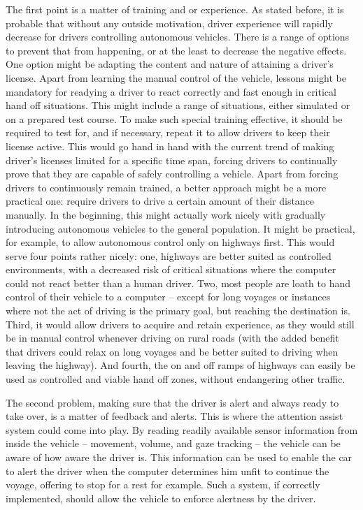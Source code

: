 \documentclass{acm_proc_article-sp}
\begin{document}
The first point is a matter of training and or experience.
As stated before, it is probable that without any outside motivation, driver experience will rapidly decrease for drivers controlling autonomous vehicles.
There is a range of options to prevent that from happening, or at the least to decrease the negative effects.
One option might be adapting the content and nature of attaining a driver's license.
Apart from learning the manual control of the vehicle, lessons might be mandatory for readying a driver to react correctly and fast enough in critical hand off situations.
This might include a range of situations, either simulated or on a prepared test course.
To make such special training effective, it should be required to test for, and if necessary, repeat it to allow drivers to keep their license active.
This would go hand in hand with the current trend of making driver's licenses limited for a specific time span, forcing drivers to continually prove that they are capable of safely controlling a vehicle.
Apart from forcing drivers to continuously remain trained, a better approach might be a more practical one: require drivers to drive a certain amount of their distance manually.
In the beginning, this might actually work nicely with gradually introducing autonomous vehicles to the general population.
It might be practical, for example, to allow autonomous control only on highways first.
This would serve four points rather nicely: one, highways are better suited as controlled environments, with a decreased risk of critical situations where the computer could not react better than a human driver.
Two, most people are loath to hand control of their vehicle to a computer – except for long voyages or instances where not the act of driving is the primary goal, but reaching the destination is.
Third, it would allow drivers to acquire and retain experience, as they would still be in manual control whenever driving on rural roads (with the added benefit that drivers could relax on long voyages and be better suited to driving when leaving the highway).
And fourth, the on and off ramps of highways can easily be used as controlled and viable hand off zones, without endangering other traffic.

The second problem, making sure that the driver is alert and always ready to take over, is a matter of feedback and alerts.
This is where the attention assist system could come into play.
By reading readily available sensor information from inside the vehicle – movement, volume, and gaze tracking – the vehicle can be aware of how aware the driver is.
This information can be used to enable the car to alert the driver when the computer determines him unfit to continue the voyage, offering to stop for a rest for example.
Such a system, if correctly implemented, should allow the vehicle to enforce alertness by the driver.
\end{document}
